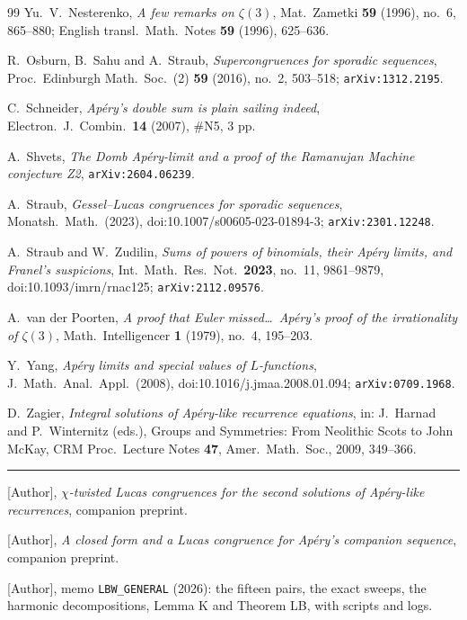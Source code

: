 \documentclass[11pt,reqno]{amsart}
\theoremstyle{plain}
\theoremstyle{definition}
\theoremstyle{remark}
\numberwithin{equation}{section}
\begin{document}
\begin{thebibliography}{99}
Yu.~V.~Nesterenko,
\emph{A few remarks on $\zeta(3)$},
Mat.\ Zametki \textbf{59} (1996), no.~6, 865--880;
English transl.\ Math.\ Notes \textbf{59} (1996), 625--636.

R.~Osburn, B.~Sahu and A.~Straub,
\emph{Supercongruences for sporadic sequences},
Proc.\ Edinburgh Math.\ Soc.\ (2) \textbf{59} (2016), no.~2, 503--518;
\texttt{arXiv:1312.2195}.

C.~Schneider,
\emph{Ap\'ery's double sum is plain sailing indeed},
Electron.\ J.\ Combin.\ \textbf{14} (2007), \#N5, 3 pp.

A.~Shvets,
\emph{The Domb Ap\'ery-limit and a proof of the Ramanujan Machine conjecture Z2},
\texttt{arXiv:2604.06239}.

A.~Straub,
\emph{Gessel--Lucas congruences for sporadic sequences},
Monatsh.\ Math.\ (2023), doi:10.1007/s00605-023-01894-3; \texttt{arXiv:2301.12248}.

A.~Straub and W.~Zudilin,
\emph{Sums of powers of binomials, their Ap\'ery limits, and Franel's suspicions},
Int.\ Math.\ Res.\ Not.\ \textbf{2023}, no.~11, 9861--9879, doi:10.1093/imrn/rnac125;
\texttt{arXiv:2112.09576}.

A.~van der Poorten,
\emph{A proof that Euler missed\dots\ Ap\'ery's proof of the irrationality of $\zeta(3)$},
Math.\ Intelligencer \textbf{1} (1979), no.~4, 195--203.

Y.~Yang,
\emph{Ap\'ery limits and special values of $L$-functions},
J.\ Math.\ Anal.\ Appl.\ (2008), doi:10.1016/j.jmaa.2008.01.094; \texttt{arXiv:0709.1968}.

D.~Zagier,
\emph{Integral solutions of Ap\'ery-like recurrence equations},
in: J.~Harnad and P.~Winternitz (eds.), Groups and Symmetries: From Neolithic Scots to John
McKay, CRM Proc.\ Lecture Notes \textbf{47}, Amer.\ Math.\ Soc., 2009, 349--366.

\medskip
\hrule
\medskip

[Author],
\emph{$\chi$-twisted Lucas congruences for the second solutions of Ap\'ery-like
recurrences}, companion preprint.

[Author],
\emph{A closed form and a Lucas congruence for Ap\'ery's companion sequence},
companion preprint.

[Author], memo \texttt{LBW\_GENERAL} (2026): the fifteen pairs, the exact sweeps, the
harmonic decompositions, Lemma K and Theorem LB, with scripts and logs.


\end{thebibliography}
\end{document}
